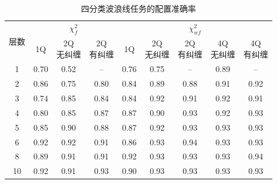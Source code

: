 \documentclass[a4paper]{ctexart}
\begin{document}
\begin{table}[H]
    \centering
    \caption{四分类波浪线任务的配置准确率}
    \label{tab:appendix-results-wavy}
    \renewcommand{\arraystretch}{1.2}
    \begin{tabular}{@{}c*{8}{c}@{}}
        \toprule
        \multirow{2}{*}{层数} & \multicolumn{3}{c}{$\chi_f^2$} & \multicolumn{5}{c}{$\chi_{wf}^2$}                                           \\
        \cmidrule(lr){2-4}\cmidrule(lr){5-9}
                            & 1Q                             & \shortstack{2Q                                                              \\无纠缠} & \shortstack{2Q\\有纠缠} & 1Q & \shortstack{2Q\\无纠缠} & \shortstack{2Q\\有纠缠} & \shortstack{4Q\\无纠缠} & \shortstack{4Q\\有纠缠} \\
        \midrule
        1                   & 0.70                           & 0.52                              & --   & 0.76 & 0.75 & --   & 0.89 & --   \\
        2                   & 0.86                           & 0.75                              & 0.80 & 0.84 & 0.89 & 0.88 & 0.91 & 0.92 \\
        3                   & 0.74                           & 0.85                              & 0.84 & 0.84 & 0.92 & 0.91 & 0.92 & 0.91 \\
        4                   & 0.80                           & 0.85                              & 0.87 & 0.87 & 0.90 & 0.93 & 0.92 & 0.93 \\
        5                   & 0.85                           & 0.90                              & 0.88 & 0.87 & 0.92 & 0.93 & 0.93 & 0.93 \\
        6                   & 0.92                           & 0.92                              & 0.91 & 0.86 & 0.93 & 0.94 & 0.93 & 0.93 \\
        8                   & 0.89                           & 0.91                              & 0.91 & 0.92 & 0.93 & 0.93 & 0.93 & 0.94 \\
        10                  & 0.92                           & 0.91                              & 0.93 & 0.90 & 0.93 & 0.93 & 0.93 & 0.93 \\
        \bottomrule
    \end{tabular}
\end{table}
\end{document}
